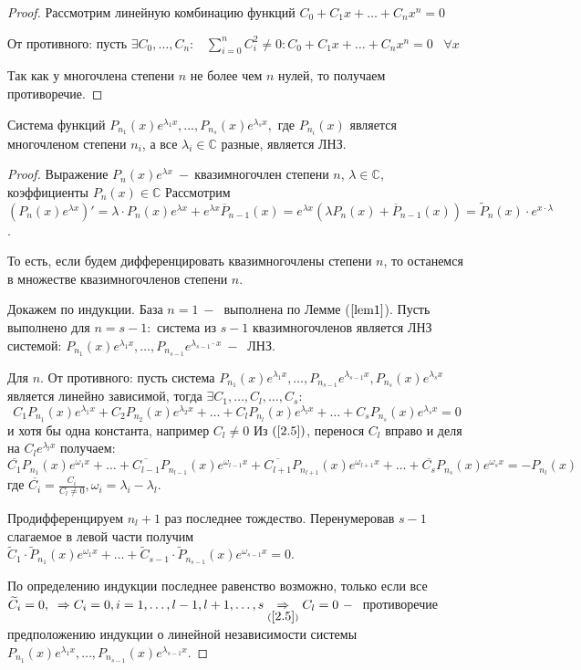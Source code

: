 \begin{proof}
Рассмотрим линейную комбинацию функций $C_0+C_1x+\dots+C_nx^n=0$\par От противного: пусть $\exists C_0, \dots, C_n:\;\;\;\displaystyle\sum_{i=0}^n C_i^2\neq0: C_0+C_1x+\dots+C_nx^n=0\;\;\;\forall x $\par Так как у многочлена степени $n$ не более чем $n$ нулей, то получаем противоречие.
\end{proof}
\begin{theorem}
Система функций $P_{n_1}(x)e^{\lambda_1 x},\dots, P_{n_s}(x)e^{\lambda_s x}, $ где $P_{n_i}(x)$ является многочленом степени $n_i$,  а все $\lambda_i \in \mathds{C}$ разные,  является ЛНЗ.
\end{theorem}
\begin{proof}
Выражение $P_n(x)e^{\lambda x}~-~$квазимногочлен степени $n$, $\lambda\in\mathds{C}$, коэффициенты $P_n(
x)\in\mathds{C}$
Рассмотрим $(P_n(x)e^{\lambda x})'=\lambda\cdot P_n(x)e^{\lambda x}+e^{\lambda x}\overline{P}_{n-1}(x)=e^{\lambda x }(\lambda P_n(x)+\overline{P}_{n-1}(x))= \widetilde{P}_n(x)\cdot e^{x\cdot \lambda}$.\par То есть, если будем дифференцировать квазимногочлены степени $n$, то останемся в множестве квазимногочленов степени $n$.\par
Докажем по индукции. База $n=1~-~$ выполнена по Лемме ($\ref{lem1}$). Пусть выполнено для $n=s-1:$ система из $s-1$ квазимногочленов является ЛНЗ системой: $P_{n_1}(x)e^{\lambda_1x}, \dots, P_{n_{s-1}}e^{\lambda_{s-1}\cdot x}~-~$ ЛНЗ.\par
Для $n$. От противного: пусть система $P_{n_1}(x)e^{\lambda_1x}, \dots, P_{n_{s-1}}e^{\lambda_{s-1}x}, P_{n_s}(x)e^{\lambda_s x}$ является линейно зависимой, тогда $\exists C_1, \dots, C_l, \dots, C_s:$
\begin{equation}
    \tag{2.5}
    \label{2.5}
    C_1P_{n_1}(x)e^{\lambda_1x}+C_2P_{n_2}(x)e^{\lambda_2x}+\dots+C_lP_{n_l}(x)e^{\lambda_lx}+\dots+C_sP_{n_s}(x)e^{\lambda_sx}=0
\end{equation}
и хотя бы одна константа, например $C_l\neq0$ Из $(\ref{2.5})$, перенося $C_l$ вправо и деля на $C_le^{\lambda_lx}$ получаем:
$$\overline{C_1}P_{n_1}(x)e^{\omega_1x}+\dots+\overline{C_{l-1}}P_{n_{l-1}}(x)e^{\omega_{l-1}x}+\overline{C_{l+1}}P_{n_{l+1}}(x)e^{\omega_{l+1}x}+\dots+\overline{C_s}P_{n_s}(x)e^{\omega_sx}=-P_{n_l}(x)$$ где $\overline{C_i}=\frac{C_i}{C_l\neq0}, \omega_i=\lambda_i-\lambda_l$.\par Продифференцируем $n_{l}+1$ раз последнее тождество. Перенумеровав $s-1$ слагаемое в левой части получим $\widetilde{C}_1\cdot \widetilde{P}_{n_1}(x)e^{\omega_1x}+\dots+\widetilde{C}_{s-1} \cdot \widetilde{P}_{n_{s-1}}(x)e^{\omega_{s-1}x}=0$.\par По определению индукции последнее равенство возможно, только если  все $\widetilde{C}_i=0, \;\;\Rightarrow C_i =0, i=1, \dots, l-1, l+1, \dots, s\underset{(\ref{2.5})}{\Rightarrow} C_l=0~-~$ противоречие предположению индукции о линейной независимости системы $P_{n_1}(x)e^{\lambda_1x}, \dots, P_{n_{s-1}}(x)e^{\lambda_{s-1}x}$.
\end{proof}
